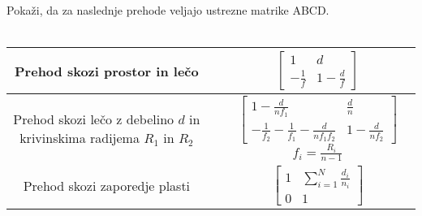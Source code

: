\begin{definition}
Pokaži, da za naslednje prehode veljajo ustrezne matrike ABCD. \\ \\
\begin{tabular}{|c|c|c|} \hline  
      Prehod skozi prostor in lečo & \parbox[c]{3cm}{\def\svgwidth{3cm}} & 
      $\begin{bmatrix} 1 & d\\ -\frac{1}{f} & 1-\frac{d}{f} \end{bmatrix}$ \\ \hline
      \parbox[c]{12em}{Prehod skozi lečo z debelino $d$ 
      in krivinskima radijema $R_1$ in $R_2$}& 
      \parbox[c]{3cm}{\def\svgwidth{3cm}} & 
      $\begin{bmatrix} 1-\frac{d}{nf_{1}} & \frac{d}{n}\\
      -\frac{1}{f_2}- \frac{1}{f_1}-\frac{d}{nf_1f_2}& 1-\frac{d}{nf_{2}} \end{bmatrix}$
      $f_{i}=\frac{R_{i}}{n-1}$\\ \hline
      Prehod skozi zaporedje plasti & \parbox[c]{3cm}{\def\svgwidth{3cm}} & 
      $\begin{bmatrix} 1 & \sum_{i=1}^{N}\frac{d_{i}}{n_{i}}\\ 0 & 1 \end{bmatrix}$ \\ \hline 
\end{tabular}
\end{definition}
